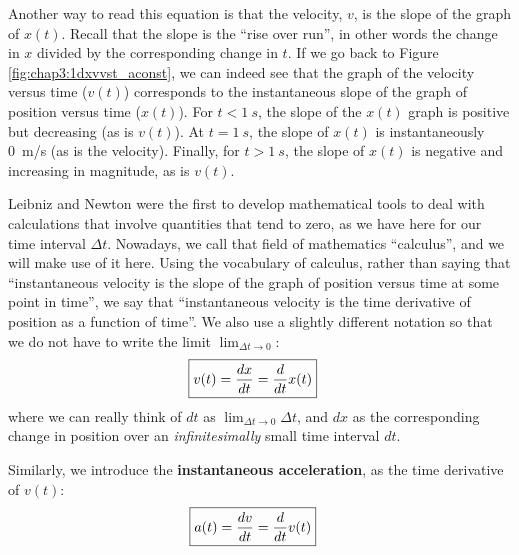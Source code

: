  Another way to read this equation is that the velocity, $v$, is the slope of the graph of $x(t)$. Recall that the slope is the ``rise over run'', in other words the change in $x$ divided by the corresponding change in $t$. If we go back to Figure \ref{fig:chap3:1dxvvst_aconst}, we can indeed see that the graph of the velocity versus time ($v(t)$) corresponds to the instantaneous slope of the graph of position versus time ($x(t)$). For $t<\SI{1}{s}$, the slope of the $x(t)$ graph is positive but decreasing (as is $v(t)$). At $t=\SI{1}{s}$, the slope of $x(t)$ is instantaneously \SI{0}{m/s} (as is the velocity). Finally, for $t>\SI{1}{s}$, the slope of $x(t)$ is negative and increasing in magnitude, as is $v(t)$.

Leibniz and Newton were the first to develop mathematical tools to deal with calculations that involve quantities that tend to zero, as we have here for our time interval $\Delta t$. Nowadays, we call that field of mathematics ``calculus'', and we will make use of it here. Using the vocabulary of calculus, rather than saying that ``instantaneous velocity is the slope of the graph of position versus time at some point in time'', we say that ``instantaneous velocity is the time derivative of position as a function of time''. We also use a slightly different notation so that we do not have to write the limit $\lim_{\Delta t\to 0}$:
\begin{align}
\label{eqn:chap3:vdef}
\Aboxed{v(t)=\frac{dx}{dt}=\frac{d}{dt} x(t)}
\end{align}
where we can really think of $dt$ as $\lim_{\Delta t\to 0}\Delta t$, and $dx$ as the corresponding change in position over an \textit{infinitesimally} small time interval $dt$.

Similarly, we introduce the \textbf{instantaneous acceleration}, as the time derivative of $v(t)$:
\begin{align}
\Aboxed{a(t)=\frac{dv}{dt}=\frac{d}{dt}v(t)}
\end{align}

